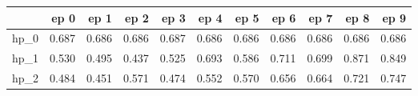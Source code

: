 \begin{tabular}{lrrrrrrrrrr}
\toprule
{} &   ep 0 &   ep 1 &   ep 2 &   ep 3 &   ep 4 &   ep 5 &   ep 6 &   ep 7 &   ep 8 &   ep 9 \\
\midrule
hp\_0 &  0.687 &  0.686 &  0.686 &  0.687 &  0.686 &  0.686 &  0.686 &  0.686 &  0.686 &  0.686 \\
hp\_1 &  0.530 &  0.495 &  0.437 &  0.525 &  0.693 &  0.586 &  0.711 &  0.699 &  0.871 &  0.849 \\
hp\_2 &  0.484 &  0.451 &  0.571 &  0.474 &  0.552 &  0.570 &  0.656 &  0.664 &  0.721 &  0.747 \\
\bottomrule
\end{tabular}
